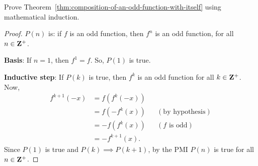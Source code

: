 \question[5] %
Prove Theorem~\ref{thm:composition-of-an-odd-function-with-itself} using mathematical induction.

\begin{EnvFullwidth}
\begin{solutionorgrid}[4.5in]
\begin{proof}
$P(n)$ is: if $f$ is an odd function, then $f^n$ is an odd function, for all $n \in \mathbf{Z}^+$.

\textbf{Basis}: If $n = 1$, then $f^1 = f$. So, $P(1)$ is true.

\textbf{Inductive step}: If $P(k)$ is true, then $f^k$ is an odd function for all $k \in \mathbf{Z}^+$. Now,
\begin{align*}
	f^{k + 1}(-x) &= f(f^k(-x)) \\
	&= f(-f^k(x)) && (\textrm{by hypothesis}) \\
	&= -f(f^k(x)) && (f \textrm{ is odd}) \\
	&= -f^{k + 1}(x).
\end{align*}
Since $P(1)$ is true and $P(k) \implies P(k + 1)$, by the PMI $P(n)$ is true for all $n \in \mathbf{Z}^+$.
\end{proof}
\end{solutionorgrid}
\end{EnvFullwidth}
